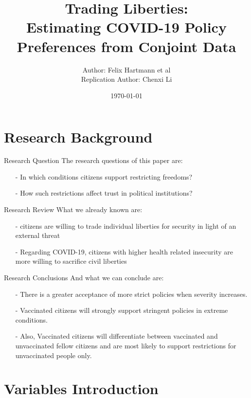 \documentclass{beamer}
\title{Trading Liberties: \\
Estimating COVID-19 Policy Preferences from Conjoint Data}
\date{\today}
\author{Author: Felix Hartmann et al \\
Replication Author: Chenxi Li}
\institute{Trinity College Dublin\\College Green, Dublin 2}
\begin{document}
\maketitle

\section{Research Background}

\begin{frame}{Research Question}
	\noindent The research questions of this paper are:
	\begin{itemize}
		\item[-] In which conditions citizens support restricting freedoms?
		\item[-] How such restrictions affect trust in political institutions?
	\end{itemize}
\end{frame}

\begin{frame}{Research Review}
\noindent What we already known are:
\begin{itemize}
	\item[-] citizens are willing to trade individual liberties for security in light of an external threat \citep{davis2004civil}
	\item[-] Regarding COVID-19, citizens with higher health related insecurity are more willing to sacrifice civil liberties \citep{stantcheva2020civil}
\end{itemize}
\end{frame}

\begin{frame}{Research Conclusions}
\noindent And what we can conclude are:
\begin{itemize}
	\item[-] There is a greater acceptance of more strict policies when severity increases.
	\item[-] Vaccinated citizens will strongly support stringent policies in extreme conditions.
	\item[-] Also, Vaccinated citizens will differentiate between vaccinated and unvaccinated fellow citizens and are most likely to support restrictions for unvaccinated people only.  
\end{itemize}
\end{frame}

\section{Variables Introduction}
\end{document}
